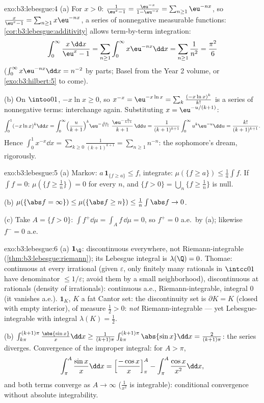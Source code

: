 \begin{solution}{exo:b3:lebesgue:4}
(a) For $x > 0$: $\frac1{\eu^x - 1} = \frac{\eu^{-x}}{1 -
\eu^{-x}} = \sum_{n\geq1}\eu^{-nx}$, so $\frac{x}{\eu^x - 1} =
\sum_{n\geq1}x\eu^{-nx}$, a series of nonnegative measurable
functions: \cref{cor:b3:lebesgue:additivity} allows term-by-term
integration:
\[
\int_0^\infty\frac{x\,\dd x}{\eu^x - 1}
= \sum_{n\geq1}\int_0^\infty x\eu^{-nx}\dd x
= \sum_{n\geq1}\frac1{n^2} = \frac{\pi^2}6
\]
($\int_0^\infty x\eu^{-nx}\dd x = n^{-2}$ by parts; Basel from
the Year 2 volume, or \cref{exo:b3:hilbert:5} to come).

(b) On $\intoo01$, $-x\ln x \geq 0$, so $x^{-x} =
\eu^{-x\ln x} = \sum_k\frac{(-x\ln x)^k}{k!}$ is a series of
nonnegative terms: interchange again. Substituting $x =
\eu^{-u/(k+1)}$:
\[
\int_0^1(-x\ln x)^k\dd x
= \int_0^\infty\Bigl(\frac{u}{k+1}\Bigr)^{k}
\eu^{-\frac{ku}{k+1}}\;\frac{\eu^{-\frac u{k+1}}}{k+1}\,\dd u
= \frac{1}{(k+1)^{k+1}}\int_0^\infty u^k\eu^{-u}\dd u
= \frac{k!}{(k+1)^{k+1}} .
\]
Hence $\int_0^1x^{-x}\dd x = \sum_{k\geq0}\frac{1}{(k+1)^{k+1}}
= \sum_{n\geq1}n^{-n}$: the sophomore's dream, rigorously.
\end{solution}

\begin{solution}{exo:b3:lebesgue:5}
(a) Markov: $a\,\mathbf 1_{\{f \geq a\}} \leq f$, integrate:
$\mu(\{f \geq a\}) \leq \frac1a\int f$. If $\int f = 0$:
$\mu(\{f \geq \frac1n\}) = 0$ for every $n$, and $\{f > 0\} =
\bigcup_n\{f \geq \frac1n\}$ is null.

(b) $\mu(\{\abs f = \infty\}) \leq \mu(\{\abs f \geq n\}) \leq
\frac1n\int\abs f \to 0$.

(c) Take $A = \{f > 0\}$: $\int f^+\dd\mu = \int_Af\,\dd\mu =
0$, so $f^+ = 0$ a.e.\ by (a); likewise $f^- = 0$ a.e.
\end{solution}

\begin{solution}{exo:b3:lebesgue:6}
(a) $\mathbf 1_\Q$: discontinuous everywhere, not
Riemann-integrable (\cref{thm:b3:lebesgue:riemann}); its
Lebesgue integral is $\lambda(\Q) = 0$. Thomae: continuous at
every irrational (given $\varepsilon$, only finitely many
rationals in $\intcc01$ have denominator $\leq
1/\varepsilon$; avoid them by a small neighborhood),
discontinuous at rationals (density of irrationals): continuous
a.e., Riemann-integrable, integral $0$ (it vanishes a.e.).
$\mathbf 1_K$, $K$ a fat Cantor set: the discontinuity set is
$\partial K = K$ (closed with empty interior), of measure
$\frac12 > 0$: \emph{not} Riemann-integrable --- yet
Lebesgue-integrable with integral $\lambda(K) = \frac12$.

(b) $\int_{k\pi}^{(k+1)\pi}\frac{\abs{\sin x}}x\dd x \geq
\frac1{(k+1)\pi}\int_{k\pi}^{(k+1)\pi}\abs{\sin x}\dd x =
\frac{2}{(k+1)\pi}$: the series diverges. Convergence of the
improper integral: for $A > \pi$,
\[
\int_\pi^A\frac{\sin x}x\dd x = \Bigl[\frac{-\cos
x}x\Bigr]_\pi^A - \int_\pi^A\frac{\cos x}{x^2}\dd x,
\]
and both terms converge as $A \to \infty$ ($\frac1{x^2}$ is
integrable): conditional convergence without absolute
integrability.
\end{solution}

